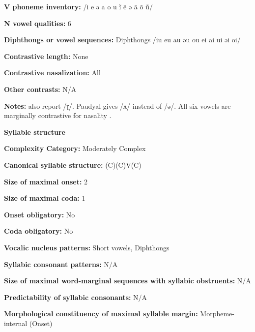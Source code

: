 \textbf{V phoneme inventory:} /i e ə a o u ĩ ẽ ə ã õ ũ/



\textbf{N vowel qualities:} 6



\textbf{Diphthongs or vowel sequences:} Diphthongs /iu eu au əu ou ei ai ui əi oi/



\textbf{Contrastive length:} None



\textbf{Contrastive nasalization:} All



\textbf{Other contrasts:} N/A



\textbf{Notes:} \citealt{KotapishKotapish1973} also report /ɽ/. Paudyal gives /ʌ/ instead of /ə/. All six vowels are marginally contrastive for nasality \citep[7]{Dhakal2012}.



\textbf{Syllable structure}



\textbf{Complexity Category:} Moderately Complex



\textbf{Canonical syllable structure:} (C)(C)V(C) \citep[17-20]{Dhakal2012}



\textbf{Size of maximal onset:} 2



\textbf{Size of maximal coda:} 1



\textbf{Onset obligatory:} No



\textbf{Coda obligatory:} No



\textbf{Vocalic nucleus patterns:} Short vowels, Diphthongs



\textbf{Syllabic consonant patterns:} N/A



\textbf{Size of maximal word{}-marginal sequences with syllabic obstruents:} N/A



\textbf{Predictability of syllabic consonants:} N/A



\textbf{Morphological constituency of maximal syllable margin:} Morpheme-internal (Onset)



